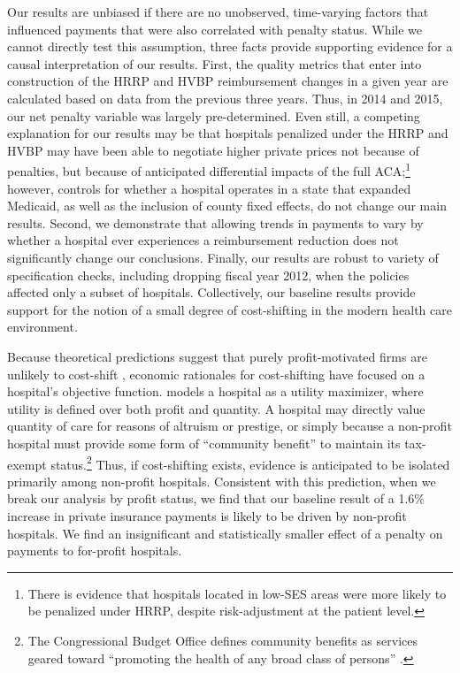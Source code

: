 \documentclass[12pt]{article}
\begin{document}
Our results are unbiased if there are no unobserved, time-varying factors that influenced payments that were also correlated with penalty status.  While we cannot directly test this assumption, three facts provide supporting evidence for a causal interpretation of our results.  First, the quality metrics that enter into construction of the HRRP and HVBP reimbursement changes in a given year are calculated based on data from the previous three years.  Thus, in 2014 and 2015, our net penalty variable was largely pre-determined.  Even still, a competing explanation for our results may be that hospitals penalized under the HRRP and HVBP may have been able to negotiate higher private prices not because of penalties, but because of anticipated differential impacts of the full ACA;\footnote{There is evidence that hospitals located in low-SES areas were more likely to be penalized under HRRP, despite risk-adjustment at the patient level.} however, controls for whether a hospital operates in a state that expanded Medicaid, as well as the inclusion of county fixed effects, do not change our main results.   Second, we demonstrate that allowing trends in payments to vary by whether a hospital ever experiences a reimbursement reduction does not significantly change our conclusions.  Finally, our results are robust to variety of specification checks, including dropping fiscal year 2012, when the policies affected only a subset of hospitals.  Collectively, our baseline results provide support for the notion of a small degree of cost-shifting in the modern health care environment.

Because theoretical predictions suggest that purely profit-motivated firms are unlikely to cost-shift \citep{hay1983}, economic rationales for cost-shifting have focused on a hospital's objective function.  \cite{dranove1988} models a hospital as a utility maximizer, where utility is defined over both profit and quantity.  A hospital may directly value quantity of care for reasons of altruism or prestige, or simply because a non-profit hospital must provide some form of ``community benefit'' to maintain its tax-exempt status.\footnote{The Congressional Budget Office defines community benefits as services geared toward ``promoting the health of any broad class of persons'' \citep{cbo2006}.}  Thus, if cost-shifting exists, evidence is anticipated to be isolated primarily among non-profit hospitals. Consistent with this prediction, when we break our analysis by profit status, we find that our baseline result of a 1.6$\%$ increase in private insurance payments is likely to be driven by non-profit hospitals.  We find an insignificant and statistically smaller effect of a penalty on payments to for-profit hospitals.
\end{document}
